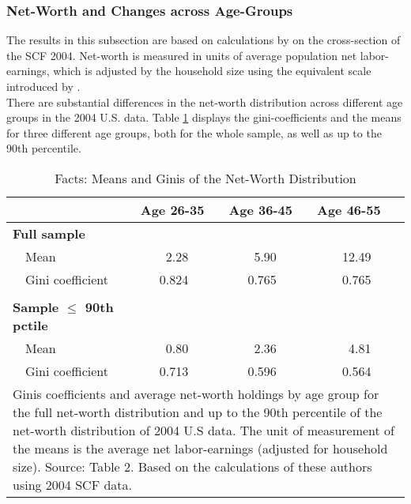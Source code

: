 \documentclass[a4paper,12pt,legno]{article}
\begin{document}
\subsubsection{Net-Worth and Changes across Age-Groups}
The results in this subsection are based on calculations by \cite{hintermaier2011} on the cross-section of the SCF 2004. Net-worth is measured in units of average population net labor- earnings, which is adjusted by the household size using the equivalent scale introduced by \cite{fernandez2007consumption}. \\
There are substantial differences in the net-worth distribution across different age groups in the 2004 U.S. data. 
Table \ref{facts_changes} displays the gini-coefficients and the means for three different age groups, both for the whole sample, as well as up to the 90th percentile.\\ 

\begin{table}[!htbp]
\centering
\caption{Facts: Means and Ginis of the Net-Worth Distribution}
\label{facts_changes}
\begin{tabular}{@{}llll@{}}
\toprule
                     & Age 26-35 & Age 36-45 & Age 46-55 \\ \midrule
\textbf{Full sample}          &           &           &           \\
\ \ Mean                 & \ \ \ \ 2.28      & \ \ \ \ 5.90      & \ \ \ \ 12.49     \\
\ \ Gini coefficient     & \ \ \ 0.824     & \ \ \ 0.765     & \ \ \ \ 0.765     \\ \\
\textbf{Sample $\leq$ 90th pctile} &           &           &           \\
\ \ Mean                 & \ \ \ \ 0.80      & \ \ \ \ 2.36      & \ \ \ \ \ 4.81      \\
\ \ Gini coefficient     & \ \ \ 0.713     & \ \ \ 0.596     & \ \ \ \ 0.564     \\ \bottomrule
\multicolumn{4}{l}{%
  \begin{minipage}{11.5cm}%
    \small Ginis coefficients and average net-worth holdings by age group for the full net-worth distribution and up to the 90th percentile of the net-worth distribution of 2004 U.S data. The unit of measurement of the means is the average net labor-earnings (adjusted for household size). Source: \cite{hintermaier2011} Table 2. Based on the calculations of these authors using 2004 SCF data. 
  \end{minipage}%
}\\
\end{tabular}
\end{table}
\end{document}
